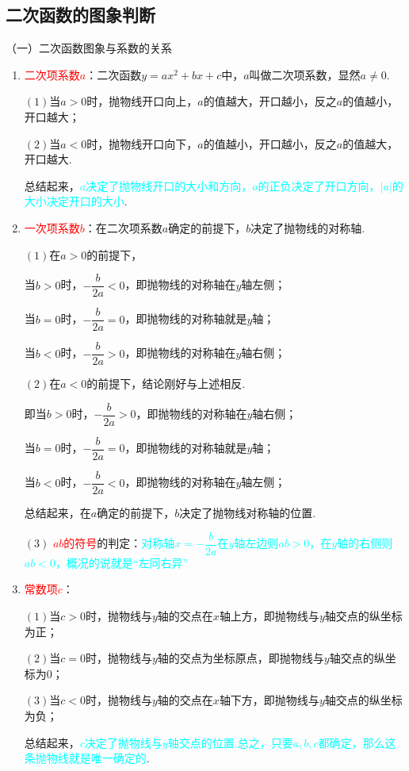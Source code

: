 \documentclass[10pt]{ctexart}
\newcommand{\abs}[1]{\left| #1 \right|}
\begin{document}
\subsection{二次函数的图象判断}
（一）二次函数图象与系数的关系
\begin{enumerate}
\item \textcolor{red}{二次项系数$a$}：二次函数$y=ax^2+bx+c$中，$a$叫做二次项系数，显然$a\neq 0$.

$(1)$当$a>0$时，抛物线开口向上，$a$的值越大，开口越小，反之$a$的值越小，开口越大；

$(2)$当$a<0$时，抛物线开口向下，$a$的值越小，开口越小，反之$a$的值越大，开口越大.

总结起来，\textcolor{cyan}{$a$决定了抛物线开口的大小和方向，$a$的正负决定了开口方向，$\abs{a}$的大小决定开口的大小}.
\item \textcolor{red}{一次项系数$b$}：在二次项系数$a$确定的前提下，$b$决定了抛物线的对称轴.

$(1)$在$a>0$的前提下，

\begin{shaded}
当$b>0$时，$-\dfrac{b}{2a}<0$，即抛物线的对称轴在$y$轴左侧；

当$b=0$时，$-\dfrac{b}{2a}=0$，即抛物线的对称轴就是$y$轴；

当$b<0$时，$-\dfrac{b}{2a}>0$，即抛物线的对称轴在$y$轴右侧；
\end{shaded}

$(2)$在$a<0$的前提下，结论刚好与上述相反.

\begin{shaded}
即当$b>0$时，$-\dfrac{b}{2a}>0$，即抛物线的对称轴在$y$轴右侧；

当$b=0$时，$-\dfrac{b}{2a}=0$，即抛物线的对称轴就是$y$轴；

当$b<0$时，$-\dfrac{b}{2a}<0$，即抛物线的对称轴在$y$轴左侧；
\end{shaded}

总结起来，在$a$确定的前提下，$b$决定了抛物线对称轴的位置.

$(3)$ \textcolor{red}{$ab$的符号}的判定：\textcolor{cyan}{对称轴$x=-\dfrac{b}{2a}$在$y$轴左边则$ab>0$，在$y$轴的右侧则$ab<0$，概况的说就是“左同右异”}
\item \textcolor{red}{常数项$c$}：

$(1)$当$c>0$时，抛物线与$y$轴的交点在$x$轴上方，即抛物线与$y$轴交点的纵坐标为正；

$(2)$当$c=0$时，抛物线与$y$轴的交点为坐标原点，即抛物线与$y$轴交点的纵坐标为$0$；

$(3)$当$c<0$时，抛物线与$y$轴的交点在$x$轴下方，即抛物线与$y$轴交点的纵坐标为负；

总结起来，\textcolor{cyan}{$c$决定了抛物线与$y$轴交点的位置.总之，只要$a,b,c$都确定，那么这条抛物线就是唯一确定的}.
\end{enumerate}
\end{document}
